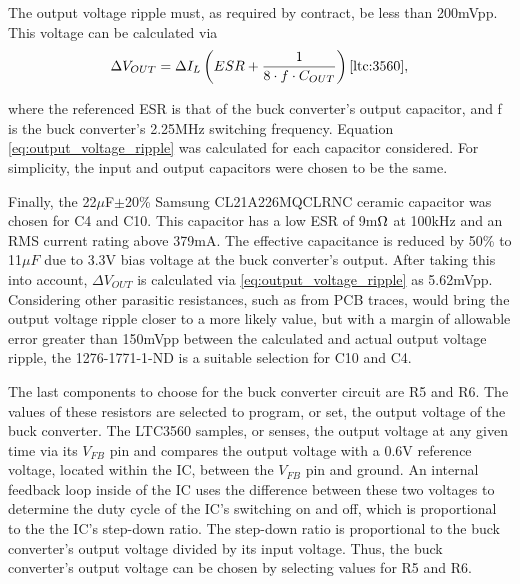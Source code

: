 The output voltage ripple must, as required by contract, be less than 200mVpp. This voltage can be calculated via 
\begin{equation}
\label{eq:output_voltage_ripple}
    {\Delta}V_{OUT} = {\Delta}I_{L}\left(ESR + \frac{1}{8\cdot f \cdot C_{OUT}} \right) \cite{ltc:3560},
\end{equation}

where the referenced ESR is that of the buck converter's output capacitor, and f is the buck converter's 2.25MHz switching frequency. Equation \ref{eq:output_voltage_ripple} was calculated for each capacitor considered. For simplicity, the input and output capacitors were chosen to be the same.

Finally, the 22$\mu$F$\pm$20\% Samsung CL21A226MQCLRNC ceramic capacitor was chosen for C4 and C10. This capacitor has a low ESR of 9m$\ohm$ at 100kHz and an RMS current rating above 379mA. The effective capacitance is reduced by 50\% to 11$\mu{F}$ due to 3.3V bias voltage at the buck converter's output. After taking this into account, ${\Delta}V_{OUT}$ is calculated via \ref{eq:output_voltage_ripple} as 5.62mVpp. Considering other parasitic resistances, such as from PCB traces, would bring the output voltage ripple closer to a more likely value, but with a margin of allowable error greater than 150mVpp between the calculated and actual output voltage ripple, the 1276-1771-1-ND is a suitable selection for C10 and C4. 


The last components to choose for the buck converter circuit are R5 and R6. The values of these resistors are selected to program, or set, the output voltage of the buck converter. The LTC3560 samples, or senses, the output voltage at any given time via its $V_{FB}$ pin and compares the output voltage with a 0.6V reference voltage, located within the IC, between the $V_{FB}$ pin and ground. An internal feedback loop inside of the IC uses the difference between these two voltages to determine the duty cycle of the IC's switching on and off, which is proportional to the the IC's step-down ratio. The step-down ratio is proportional to the buck converter's output voltage divided by its input voltage. Thus, the buck converter's output voltage can be chosen by selecting values for R5 and R6.

